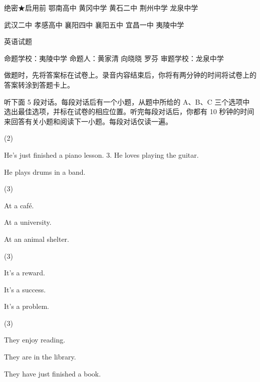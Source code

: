 \documentclass{英语试卷}
\begin{document}
\par 绝密★启用前 鄂南高中 黄冈中学 黄石二中 荆州中学 龙泉中学\par
\par 武汉二中 孝感高中 襄阳四中 襄阳五中 宜昌一中 夷陵中学\par
\par 英语试题\par
\par 命题学校：夷陵中学 命题人：黄家清 向晓晓 罗芬 审题学校：龙泉中学\par
{}
\par 做题时，先将答案标在试卷上。录音内容结束后，你将有两分钟的时间将试卷上的答案转涂到答题卡上。\par
{}
\par 听下面 5 段对话。每段对话后有一个小题，从题中所给的 A、B、C 三个选项中选出最佳选项，并标在试卷的相应位置。听完每段对话后，你都有 10 秒钟的时间来回答有关小题和阅读下一小题。每段对话仅读一遍。\par
{}
\begin{choices}(2)
  \item He's just finished a piano lesson. 3. He loves playing the guitar.
  \item He plays drums in a band.
\end{choices}
\begin{choices}(3)
  \item At a café.
  \item At a university.
  \item At an animal shelter.
\end{choices}
\begin{choices}(3)
  \item It's a reward.
  \item It's a success.
  \item It's a problem.
\end{choices}
\begin{choices}(3)
  \item They enjoy reading.
  \item They are in the library.
  \item They have just finished a book.
\end{choices}
\end{document}
